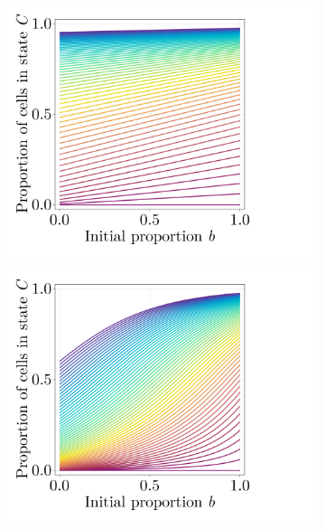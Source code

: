 \begin{figure}[ht]
\begin{subfigure}{0.4\textwidth}
    \end{subfigure}
    \\
    \begin{subfigure}{0.4\textwidth}
        \centering
        \includegraphics[width=\textwidth]{figures/407/407-phic-vs-b-solution-constant-all.png}
    \end{subfigure}
    \hspace{5em}
    \begin{subfigure}{0.4\textwidth}
        \centering
        \includegraphics[width=\textwidth]{figures/407/407-phic-vs-b-solution-meanfield-all.png}

\end{subfigure}
\end{figure}
